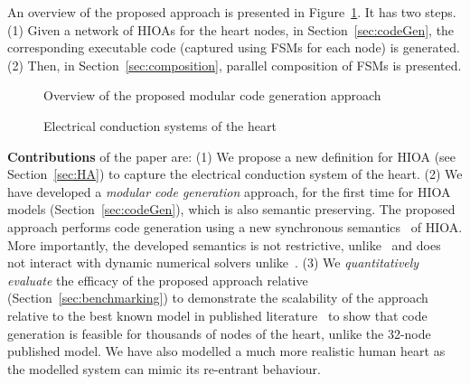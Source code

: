    
An overview of the proposed approach is presented in
Figure~\ref{fig:overview}. It has two steps.
(1) Given a network of \acp{HIOA} for the heart nodes,
in Section~\ref{sec:codeGen}, 
 the corresponding executable code (captured using
 \acp{FSM} for each node) is generated.
 (2) Then, in Section~\ref{sec:composition}, parallel composition of 
 \acp{FSM} is presented.


\begin{figure}[bthp]
  \centering
  \scalebox{0.7}{
    
  }
  \caption{Overview of the proposed modular 
    code generation approach \label{fig:overview}}
\end{figure}

\begin{figure*}[hbpt]
	\centering
	
	\caption{Electrical conduction systems of the heart}
	\label{fig:heartOverview}
\end{figure*}
      
\textbf{Contributions} of the paper are: (1) We propose a
new definition for \acf{HIOA} (see
Section~\ref{sec:HA}) to capture  the electrical conduction system of
the heart. (2) We have developed a \emph{modular code generation}
approach, for the first time for \ac{HIOA} models
(Section~\ref{sec:codeGen}), which is also semantic preserving.  The
proposed approach performs code generation using a new synchronous
semantics~\cite{benveniste03} of \ac{HIOA}. More importantly, the
developed semantics is not restrictive, unlike~\cite{alur2003generating,
  kim2003modular} and does not interact with dynamic numerical solvers
unlike~\cite{ptolemaeus2014system, bourke13zelus}.  (3) We
\emph{quantitatively evaluate} the efficacy of the proposed approach
relative \simulink (Section~\ref{sec:benchmarking}) to demonstrate the
scalability of the approach relative to the best known model in
published literature~\cite{chen14} to show that code generation is
feasible for thousands of nodes of the heart, unlike the 32-node
published model. We have also modelled a much more realistic human heart
as the modelled system can mimic its re-entrant behaviour.
 

 

